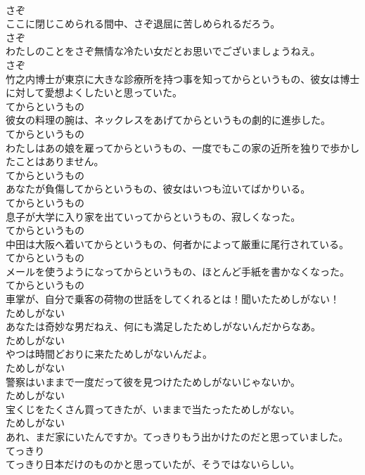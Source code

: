 \documentclass[8pt]{extreport}
\begin{document}
\begin{CJK}{UTF8}{min}
\\	さぞ
\\	ここに閉じこめられる間中、さぞ退屈に苦しめられるだろう。	
\\	さぞ
\\	わたしのことをさぞ無情な冷たい女だとお思いでございましょうねえ。	
\\	さぞ
\\	竹之内博士が東京に大きな診療所を持つ事を知ってからというもの、彼女は博士に対して愛想よくしたいと思っていた。	
\\	てからというもの
\\	彼女の料理の腕は、ネックレスをあげてからというもの劇的に進歩した。	
\\	てからというもの
\\	わたしはあの娘を雇ってからというもの、一度でもこの家の近所を独りで歩かしたことはありません。	
\\	てからというもの
\\	あなたが負傷してからというもの、彼女はいつも泣いてばかりいる。	
\\	てからというもの
\\	息子が大学に入り家を出ていってからというもの、寂しくなった。	
\\	てからというもの
\\	中田は大阪へ着いてからというもの、何者かによって厳重に尾行されている。	
\\	てからというもの
\\	メールを使うようになってからというもの、ほとんど手紙を書かなくなった。	
\\	てからというもの
\\	車掌が、自分で乗客の荷物の世話をしてくれるとは！聞いたためしがない！	
\\	ためしがない
\\	あなたは奇妙な男だねえ、何にも満足したためしがないんだからなあ。	
\\	ためしがない
\\	やつは時間どおりに来たためしがないんだよ。	
\\	ためしがない
\\	警察はいままで一度だって彼を見つけたためしがないじゃないか。	
\\	ためしがない
\\	宝くじをたくさん買ってきたが、いままで当たったためしがない。	
\\	ためしがない
\\	あれ、まだ家にいたんですか。てっきりもう出かけたのだと思っていました。	
\\	てっきり
\\	てっきり日本だけのものかと思っていたが、そうではないらしい。	

\end{CJK}
\end{document}
